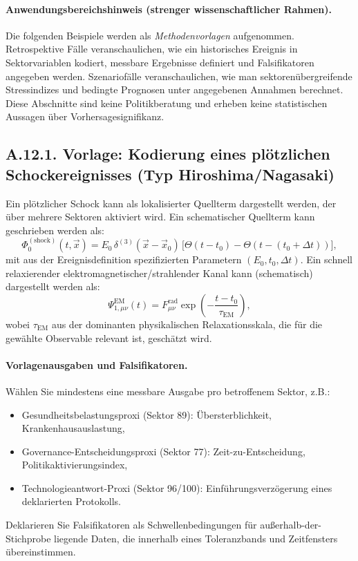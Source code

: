 \documentclass[13pt,a4paper]{article}
\begin{document}
	\paragraph{Anwendungsbereichshinweis (strenger wissenschaftlicher Rahmen).}
	Die folgenden Beispiele werden als \emph{Methodenvorlagen} aufgenommen. Retrospektive Fälle veranschaulichen, wie ein historisches Ereignis in Sektorvariablen kodiert, messbare Ergebnisse definiert und Falsifikatoren angegeben werden. Szenariofälle veranschaulichen, wie man sektorenübergreifende Stressindizes und bedingte Prognosen unter angegebenen Annahmen berechnet. Diese Abschnitte sind keine Politikberatung und erheben keine statistischen Aussagen über Vorhersagesignifikanz.
	
	\subsection*{A.12.1. Vorlage: Kodierung eines plötzlichen Schockereignisses (Typ Hiroshima/Nagasaki)}
	
	Ein plötzlicher Schock kann als lokalisierter Quellterm dargestellt werden, der über mehrere Sektoren aktiviert wird. Ein schematischer Quellterm kann geschrieben werden als:
	$$ \Phi_{0}^{(\mathrm{shock})}(t,\vec{x}) = E_0\,\delta^{(3)}(\vec{x}-\vec{x}_0)\,\big[\Theta(t-t_0)-\Theta(t-(t_0+\Delta t))\big], $$
	mit aus der Ereignisdefinition spezifizierten Parametern $(E_0,t_0,\Delta t)$. Ein schnell relaxierender elektromagnetischer/strahlender Kanal kann (schematisch) dargestellt werden als:
	$$ \Psi_{1,\mu\nu}^{\mathrm{EM}}(t)=F_{\mu\nu}^{\mathrm{rad}}\exp\!\left(-\frac{t-t_0}{\tau_{\mathrm{EM}}}\right), $$
	wobei $\tau_{\mathrm{EM}}$ aus der dominanten physikalischen Relaxationsskala, die für die gewählte Observable relevant ist, geschätzt wird.
	
	\paragraph{Vorlagenausgaben und Falsifikatoren.}
	Wählen Sie mindestens eine messbare Ausgabe pro betroffenem Sektor, z.B.:
	\begin{itemize}[leftmargin=*]
		\item Gesundheitsbelastungsproxi (Sektor 89): Übersterblichkeit, Krankenhausauslastung,
		\item Governance-Entscheidungsproxi (Sektor 77): Zeit-zu-Entscheidung, Politikaktivierungsindex,
		\item Technologieantwort-Proxi (Sektor 96/100): Einführungsverzögerung eines deklarierten Protokolls.
	\end{itemize}
	Deklarieren Sie Falsifikatoren als Schwellenbedingungen für außerhalb-der-Stichprobe liegende Daten, die innerhalb eines Toleranzbands und Zeitfensters übereinstimmen.
	
\end{document}
